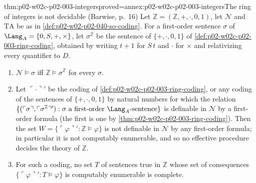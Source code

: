 \begin{hbtheorem}{thm:p02-w02c-p02-003-integers}{proved=annex:p02-w02c-p02-003-integers}{The ring of integers is not decidable (Barwise, p.~16)}
Let \(\mathbb Z=(\mathbb Z,+,\cdot,0,1)\), let \(\mathcal N\) and
\(\mathrm{TA}\) be as in \cref{def:p02-w02-p02-040-so-coding}.  For a
first-order sentence \(\sigma\) of \(\Lang_A=\{0,S,+,\times\}\), let
\(\sigma^{\mathbb Z}\) be the sentence of \(\{+,\cdot,0,1\}\) of
\cref{def:p02-w02c-p02-003-ring-coding}, obtained by writing \(t+1\) for
\(S\,t\) and \(\cdot\) for \(\times\) and relativizing every quantifier to
\(D\).
\begin{enumerate}
\item \(\mathcal N\models\sigma\) iff
      \(\mathbb Z\models\sigma^{\mathbb Z}\) for every \(\sigma\).
\item Let \(\ulcorner\cdot\urcorner'\) be the coding of
      \cref{def:p02-w02c-p02-003-ring-coding}, or any coding of the
      sentences of \(\{+,\cdot,0,1\}\) by natural numbers for which the
      relation
      \(\{(\ulcorner\sigma\urcorner,\ulcorner\sigma^{\mathbb Z}\urcorner'):
      \sigma\text{ a first-order }\Lang_A\text{-sentence}\}\) is definable
      in \(\mathcal N\) by a first-order formula (the first is one by
      \cref{thm:p02-w02c-p02-003-ring-coding}).  Then the set
      \(W=\{\ulcorner\varphi\urcorner':\mathbb Z\models\varphi\}\) is not
      definable in \(\mathcal N\) by any first-order formula; in particular
      it is not computably enumerable, and so no effective procedure
      decides the theory of \(\mathbb Z\).
\item For such a coding, no set \(T\) of sentences true in
      \(\mathbb Z\) whose set of consequences
      \(\{\ulcorner\varphi\urcorner':T\models\varphi\}\) is computably
      enumerable is complete.
\end{enumerate}
\end{hbtheorem}

